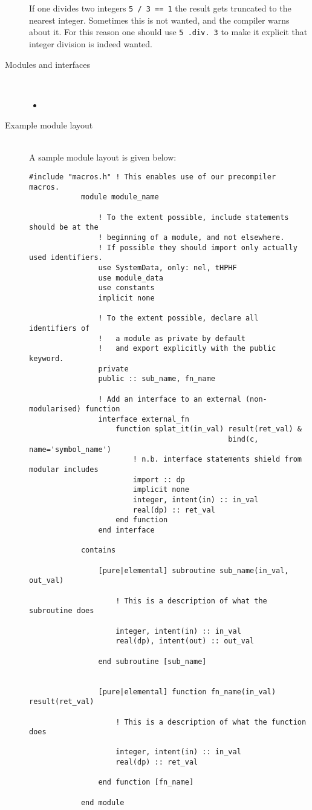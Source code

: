 \documentclass[a4paper,notitlepage]{scrreprt}
\newcommand\headitem[1]{\needspace{1.5\baselineskip}\item[{\boldmath #1 \nopagebreak}] \hfill \\ \nopagebreak}
\let\code\lstinline
\begin{document}
\begin{description}
    If one divides two integers \code{5 / 3 == 1} the result gets truncated
    to the nearest integer.
    Sometimes this is not wanted, and the compiler warns about it.
    For this reason one should use \code{5 .div. 3} to make it explicit
    that integer division is indeed wanted.

	\headitem{Modules and interfaces}
		\begin{itemize}
			\item
		\end{itemize}

	\headitem{Example module layout}
		A sample module layout is given below:
		\begin{lstlisting}[gobble=12]
            #include "macros.h" ! This enables use of our precompiler macros.
            module module_name

            	! To the extent possible, include statements should be at the
                ! beginning of a module, and not elsewhere.
                ! If possible they should import only actually used identifiers.
            	use SystemData, only: nel, tHPHF
            	use module_data
            	use constants
            	implicit none

                ! To the extent possible, declare all identifiers of
                !   a module as private by default
                !   and export explicitly with the public keyword.
                private
                public :: sub_name, fn_name

                ! Add an interface to an external (non-modularised) function
            	interface external_fn
            	    function splat_it(in_val) result(ret_val) &
											  bind(c, name='symbol_name')
            		    ! n.b. interface statements shield from modular includes
            			import :: dp
            			implicit none
            			integer, intent(in) :: in_val
            			real(dp) :: ret_val
            		end function
            	end interface

            contains

            	[pure|elemental] subroutine sub_name(in_val, out_val)

            		! This is a description of what the subroutine does

            		integer, intent(in) :: in_val
            		real(dp), intent(out) :: out_val

            	end subroutine [sub_name]


            	[pure|elemental] function fn_name(in_val) result(ret_val)

            		! This is a description of what the function does

            		integer, intent(in) :: in_val
            		real(dp) :: ret_val

            	end function [fn_name]

            end module
		\end{lstlisting}

\end{description}
\end{document}
